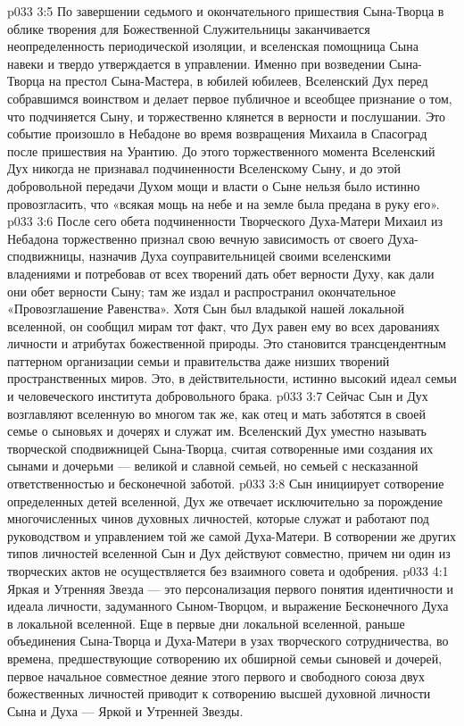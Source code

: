 \vs p033 3:5 По завершении седьмого и окончательного пришествия Сына\hyp{}Творца в облике творения для Божественной Служительницы заканчивается неопределенность периодической изоляции, и вселенская помощница Сына навеки и твердо утверждается в управлении. Именно при возведении Сына\hyp{}Творца на престол Сына\hyp{}Мастера, в юбилей юбилеев, Вселенский Дух перед собравшимся воинством и делает первое публичное и всеобщее признание о том, что подчиняется Сыну, и торжественно клянется в верности и послушании. Это событие произошло в Небадоне во время возвращения Михаила в Спасоград после пришествия на Урантию. До этого торжественного момента Вселенский Дух никогда не признавал подчиненности Вселенскому Сыну, и до этой добровольной передачи Духом мощи и власти о Сыне нельзя было истинно провозгласить, что «всякая мощь на небе и на земле была предана в руку его».
\vs p033 3:6 После сего обета подчиненности Творческого Духа\hyp{}Матери Михаил из Небадона торжественно признал свою вечную зависимость от своего Духа\hyp{}сподвижницы, назначив Духа соуправительницей своими вселенскими владениями и потребовав от всех творений дать обет верности Духу, как дали они обет верности Сыну; там же издал и распространил окончательное «Провозглашение Равенства». Хотя Сын был владыкой нашей локальной вселенной, он сообщил мирам тот факт, что Дух равен ему во всех дарованиях личности и атрибутах божественной природы. Это становится трансцендентным паттерном организации семьи и правительства даже низших творений пространственных миров. Это, в действительности, истинно высокий идеал семьи и человеческого института добровольного брака.
\vs p033 3:7 Сейчас Сын и Дух возглавляют вселенную во многом так же, как отец и мать заботятся в своей семье о сыновьях и дочерях и служат им. Вселенский Дух уместно называть творческой сподвижницей Сына\hyp{}Творца, считая сотворенные ими создания их сынами и дочерьми --- великой и славной семьей, но семьей с несказанной ответственностью и бесконечной заботой.
\vs p033 3:8 \pc Сын инициирует сотворение определенных детей вселенной, Дух же отвечает исключительно за порождение многочисленных чинов духовных личностей, которые служат и работают под руководством и управлением той же самой Духа\hyp{}Матери. В сотворении же других типов личностей вселенной Сын и Дух действуют совместно, причем ни один из творческих актов не осуществляется без взаимного совета и одобрения.
\vs p033 4:1 Яркая и Утренняя Звезда --- это персонализация первого понятия идентичности и идеала личности, задуманного Сыном\hyp{}Творцом, и выражение Бесконечного Духа в локальной вселенной. Еще в первые дни локальной вселенной, раньше объединения Сына\hyp{}Творца и Духа\hyp{}Матери в узах творческого сотрудничества, во времена, предшествующие сотворению их обширной семьи сыновей и дочерей, первое начальное совместное деяние этого первого и свободного союза двух божественных личностей приводит к сотворению высшей духовной личности Сына и Духа --- Яркой и Утренней Звезды.
